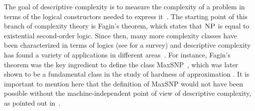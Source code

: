 
%
%
%
%	
%	
%	
%	
%

The goal of descriptive complexity is to measure the complexity of a problem in terms of the logical constructors needed to express it~\cite{immerman1999descriptive}. 
The starting point of this branch of complexity theory is Fagin's theorem, which states that $\text{\sc NP}$ is equal to existential second-order logic. Since then, many more complexity classes have been characterized in terms of logics (see \cite{G07} for a survey) and descriptive complexity has found a variety of applications in different areas~\cite{immerman1999descriptive, L04}.
For instance, Fagin's theorem was the key ingredient to define the class {\sc MaxSNP}~\cite{PY91}, which was later shown to be a fundamental class in the study of hardness of approximation \cite{ALMSS98}. 
It is important to mention here that the definition of {\sc MaxSNP} would not have been possible without the machine-independent point of view of descriptive complexity, as pointed out in~\cite{PY91}.

